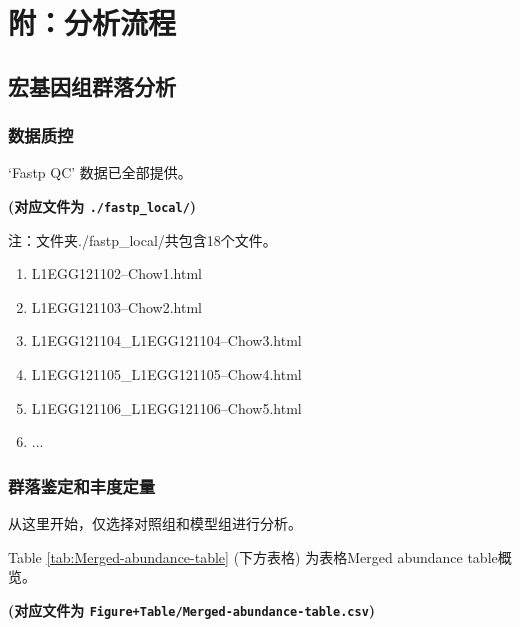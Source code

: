 \documentclass[
]{article}
\providecommand{\tightlist}{%
  \setlength{\itemsep}{0pt}\setlength{\parskip}{0pt}}
\begin{document}
\hypertarget{workflow}{%
\section{附：分析流程}\label{workflow}}

\hypertarget{ux5b8fux57faux56e0ux7ec4ux7fa4ux843dux5206ux6790}{%
\subsection{宏基因组群落分析}\label{ux5b8fux57faux56e0ux7ec4ux7fa4ux843dux5206ux6790}}

\hypertarget{ux6570ux636eux8d28ux63a7}{%
\subsubsection{数据质控}\label{ux6570ux636eux8d28ux63a7}}

`Fastp QC' 数据已全部提供。

\textbf{(对应文件为 \texttt{./fastp\_local/})}

\begin{center}\begin{tcolorbox}[colback=gray!10, colframe=gray!50, width=0.9\linewidth, arc=1mm, boxrule=0.5pt]注：文件夹./fastp\_local/共包含18个文件。

\begin{enumerate}\tightlist
\item L1EGG121102--Chow1.html
\item L1EGG121103--Chow2.html
\item L1EGG121104\_L1EGG121104--Chow3.html
\item L1EGG121105\_L1EGG121105--Chow4.html
\item L1EGG121106\_L1EGG121106--Chow5.html
\item ...
\end{enumerate}\end{tcolorbox}
\end{center}

\hypertarget{quant}{%
\subsubsection{群落鉴定和丰度定量}\label{quant}}

从这里开始，仅选择对照组和模型组进行分析。

Table \ref{tab:Merged-abundance-table} (下方表格) 为表格Merged abundance table概览。

\textbf{(对应文件为 \texttt{Figure+Table/Merged-abundance-table.csv})}
\end{document}
